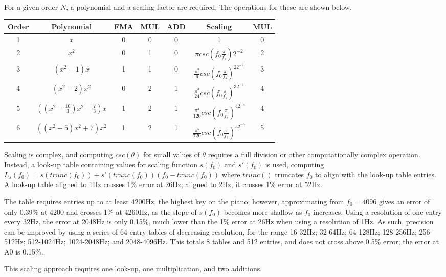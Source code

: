 For a given order $N$, a polynomial and a scaling factor are required.  The operations for these are shown below.

\begin{tabular}{|c|c|c|c|c|c|c|}
	\hline
	Order & Polynomial & FMA & MUL & ADD & Scaling & MUL \\
	\hline
	1 & $x$ & 0 & 0 & 0 & 1 & 0 \\
	\hline
	2 & $x^2$ & 0 & 1 & 0 & $\pi csc(f_0\frac{\pi}{f_s})2^{-2}$ & 2  \\
	\hline
	3 & $(x^2-1)x$ & 1 & 1 & 0 & $\frac{\pi^2}{6}csc(f_0\frac{\pi}{f_s})^22^{-2}$ & 3 \\
	\hline
	4 & $(x^2-2)x^2$ & 0 & 2 & 1 & $\frac{\pi^3}{24}csc(f_0\frac{\pi}{f_s})^32^{-3}$ & 4 \\
	\hline
	5 & $((x^2-\frac{10}{3})x^2-\frac{7}{3})x$ & 1 & 2 & 1 & $\frac{\pi^4}{120}csc(f_0\frac{\pi}{f_s})^42^{-4}$ & 4 \\
	\hline
	6 & $((x^2-5)x^2+7)x^2$ & 1 & 2 & 1 & $\frac{\pi^5}{720}csc(f_0\frac{\pi}{f_s})^52^{-5}$ & 5 \\
	\hline
\end{tabular}

Scaling is complex, and computing $csc(\theta)$ for small values of $\theta$ requires a full division or other computationally complex operation.  Instead, a look-up table containing values for scaling function $s(f_0)$ and $s'(f_0)$ is used, computing $L_s(f_0)=s(trunc(f_0))+s'(trunc(f_0))(f_0-trunc(f_0))$ where $trunc()$ truncates $f_0$ to align with the look-up table entries.  A look-up table aligned to 1Hz crosses 1\% error at 26Hz; aligned to 2Hz, it crosses 1\% error at 52Hz.

The table requires entries up to at least 4200Hz, the highest key on the piano; however, approximating from $f_0=4096$ gives an error of only 0.39\% at 4200 and crosses 1\% at 4260Hz, as the slope of $s(f_0)$ becomes more shallow as $f_0$ increases.  Using a resolution of one entry every 32Hz, the error at 2048Hz is only 0.15\%, much lower than the 1\% error at 26Hz when using a resolution of 1Hz.  As such, precision can be improved by using a series of 64-entry tables of decreasing resolution, for the range 16-32Hz; 32-64Hz; 64-128Hz; 128-256Hz; 256-512Hz; 512-1024Hz; 1024-2048Hz; and 2048-4096Hz.  This totals 8 tables and 512 entries, and does not cross above 0.5\% error; the error at A0 is 0.15\%.

This scaling approach requires one look-up, one multiplication, and two additions.


